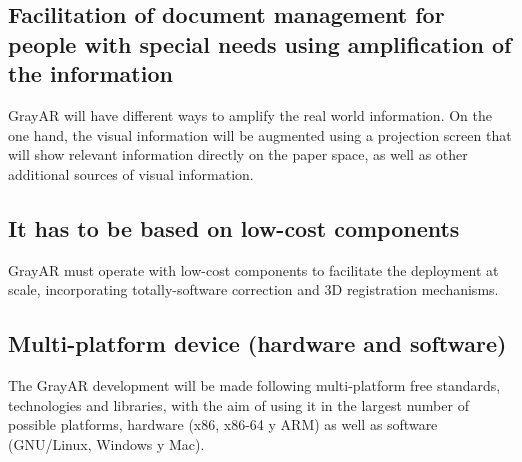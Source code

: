 \subsection{Facilitation of document management for people with special needs using amplification of the information}
GrayAR will have different ways to amplify the real world information. On the one hand, the visual information will be augmented using a projection screen that will show relevant information directly on the paper space, as well as other additional sources of visual information. 

\subsection{It has to be based on low-cost components}
GrayAR must operate with low-cost components to facilitate the deployment at scale, incorporating totally-software correction and 3D registration mechanisms. 

\subsection{Multi-platform device (hardware and software)}
The GrayAR development will be made following multi-platform free standards, technologies and libraries, with the aim of using it in the largest number of possible platforms, hardware (x86, x86-64 y ARM) as well as software (GNU/Linux, Windows y Mac).
